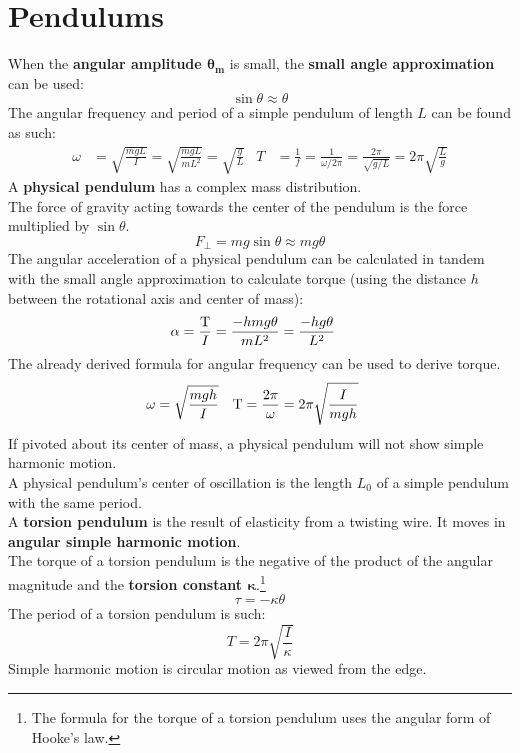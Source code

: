 \documentclass[../AP_Physics_C.tex]{subfiles}
\begin{document}
			\section{Pendulums}
				When the \textbf{angular amplitude $\bm{\theta_m}$} is small, the \textbf{small angle approximation} can be used:
				\[\sin\theta \approx \theta\]
				The angular frequency and period of a simple pendulum of length $L$ can be found as such:
				\begin{align*}
					\omega &= \sqrt{\frac{mgL}{I}} = \sqrt{\frac{mgL}{mL^2}}  = \sqrt{\frac{g}{L}} & T &= \frac{1}{f} = \frac{1}{\omega / 2\pi} = \frac{2\pi}{\sqrt{g/L}} = 2\pi\sqrt{\frac{L}{g}}
				\end{align*}
				A \textbf{physical pendulum} has a complex mass distribution. \\
				The force of gravity acting towards the center of the pendulum is the force multiplied by $\sin\theta$.
				\[F_\bot = mg\sin\theta \approx mg\theta\]
				The angular acceleration of a physical pendulum can be calculated in tandem with the small angle approximation to calculate torque (using the distance $h$ between the rotational axis and center of mass):
				\begin{align*}
					\alpha &= \frac{\operatorname{T}}{I} = \frac{-hmg\theta}{mL^2} = \frac{-hg\theta}{L^2}
				\end{align*}
				The already derived formula for angular frequency can be used to derive torque.
				\begin{align*}
					\omega &= \sqrt{\frac{mgh}{I}} & \operatorname{T} &= \frac{2\pi}{\omega} = 2\pi\sqrt{\frac{I}{mgh}}
				\end{align*}
				If pivoted about its center of mass, a physical pendulum will not show simple harmonic motion. \\
				A physical pendulum's center of oscillation is the length $L_0$ of a simple pendulum with the same period. \\
				A \textbf{torsion pendulum} is the result of elasticity from a twisting wire. It moves in \textbf{angular simple harmonic motion}. \\
				The torque of a torsion pendulum is the negative of the product of the angular magnitude and the \textbf{torsion constant $\bm{\kappa}$}.\footnote{The formula for the torque of a torsion pendulum uses the angular form of Hooke's law.}
				\[\tau = -\kappa\theta\]
				The period of a torsion pendulum is such:
				\[T = 2\pi\sqrt{\frac{I}{\kappa}}\]
				Simple harmonic motion is circular motion as viewed from the edge. \\
				
\end{document}
